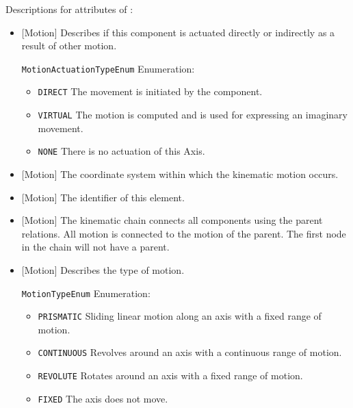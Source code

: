 Descriptions for attributes of :

\begin{itemize}

\item {}[Motion] \newline Describes if this component is actuated directly or indirectly as a result of other motion.

\texttt{MotionActuationTypeEnum} Enumeration:

\begin{itemize}
\item \texttt{DIRECT} \newline The movement is initiated by the component. 
\item \texttt{VIRTUAL} \newline The motion is computed and is used for expressing an imaginary movement. 
\item \texttt{NONE} \newline There is no actuation of this Axis. 
\end{itemize}


\item {}[Motion] \newline The coordinate system within which the kinematic motion occurs.

\item {}[Motion] \newline The identifier of this element.

\item {}[Motion] \newline The kinematic chain connects all components using the parent relations. All motion is connected to the motion of the parent. The first node in the chain will not have a parent.

\item {}[Motion] \newline Describes the type of motion.

\texttt{MotionTypeEnum} Enumeration:

\begin{itemize}
\item \texttt{PRISMATIC} \newline Sliding linear motion along an axis with a fixed range of motion. 
\item \texttt{CONTINUOUS} \newline Revolves around an axis with a continuous range of motion. 
\item \texttt{REVOLUTE} \newline Rotates around an axis with a fixed range of motion. 
\item \texttt{FIXED} \newline The axis does not move. 
\end{itemize}

\end{itemize}


